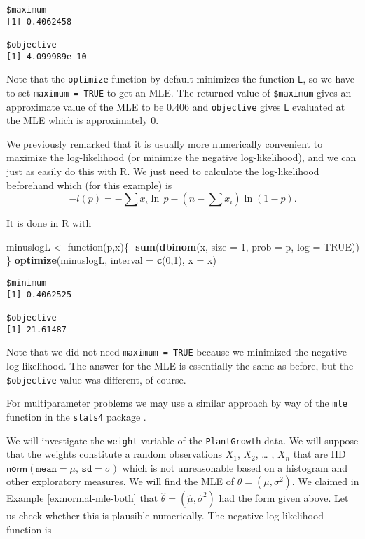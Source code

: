 \documentclass[]{book}
\newenvironment{Shaded}{\begin{snugshade}}{\end{snugshade}}
\newcommand{\KeywordTok}[1]{\textcolor[rgb]{0.13,0.29,0.53}{\textbf{{#1}}}}
\newcommand{\DataTypeTok}[1]{\textcolor[rgb]{0.13,0.29,0.53}{{#1}}}
\newcommand{\DecValTok}[1]{\textcolor[rgb]{0.00,0.00,0.81}{{#1}}}
\newcommand{\StringTok}[1]{\textcolor[rgb]{0.31,0.60,0.02}{{#1}}}
\newcommand{\OtherTok}[1]{\textcolor[rgb]{0.56,0.35,0.01}{{#1}}}
\newcommand{\NormalTok}[1]{{#1}}
\numberwithin{equation}{chapter}
\numberwithin{figure}{chapter}
\theoremstyle{plain}
\theoremstyle{definition}
\theoremstyle{remark}
\theoremstyle{definition}
\theoremstyle{definition}
\theoremstyle{remark}
\let\BeginKnitrBlock\begin \let\EndKnitrBlock\end
\begin{document}
\begin{verbatim}
$maximum
[1] 0.4062458

$objective
[1] 4.099989e-10
\end{verbatim}

Note that the \texttt{optimize} function by default minimizes the
function \texttt{L}, so we have to set \texttt{maximum\ =\ TRUE} to get
an MLE. The returned value of \texttt{\$maximum} gives an approximate
value of the MLE to be 0.406 and \texttt{objective} gives \texttt{L}
evaluated at the MLE which is approximately 0.

We previously remarked that it is usually more numerically convenient to
maximize the log-likelihood (or minimize the negative log-likelihood),
and we can just as easily do this with R. We just need to calculate the
log-likelihood beforehand which (for this example) is
\[ -l(p)=-\sum x_{i}\ln\,
p-\left(n-\sum x_{i}\right)\ln(1-p).  \]

It is done in R with

\begin{Shaded}
\begin{Highlighting}[]
\NormalTok{minuslogL <-}\StringTok{ }\NormalTok{function(p,x)\{}
                \NormalTok{-}\KeywordTok{sum}\NormalTok{(}\KeywordTok{dbinom}\NormalTok{(x, }\DataTypeTok{size =} \DecValTok{1}\NormalTok{, }\DataTypeTok{prob =} \NormalTok{p, }\DataTypeTok{log =} \OtherTok{TRUE}\NormalTok{))}
             \NormalTok{\}}
\KeywordTok{optimize}\NormalTok{(minuslogL, }\DataTypeTok{interval =} \KeywordTok{c}\NormalTok{(}\DecValTok{0}\NormalTok{,}\DecValTok{1}\NormalTok{), }\DataTypeTok{x =} \NormalTok{x)}
\end{Highlighting}
\end{Shaded}

\begin{verbatim}
$minimum
[1] 0.4062525

$objective
[1] 21.61487
\end{verbatim}

Note that we did not need \texttt{maximum\ =\ TRUE} because we minimized
the negative log-likelihood. The answer for the MLE is essentially the
same as before, but the \texttt{\$objective} value was different, of
course.

For multiparameter problems we may use a similar approach by way of the
\texttt{mle} function in the \texttt{stats4} package \autocite{stats4}.

\bigskip

\BeginKnitrBlock{example}[Plant Growth]
\protect\hypertarget{ex:unnamed-chunk-347}{}{\label{ex:unnamed-chunk-347}
\iffalse (Plant Growth) \fi }We will investigate the \texttt{weight}
variable of the \texttt{PlantGrowth} data. We will suppose that the
weights constitute a random observations \(X_{1}\), \(X_{2}\), \ldots{}
, \(X_{n}\) that are IID
\(\mathsf{norm}(\mathtt{mean}=\mu,\,\mathtt{sd}=\sigma)\) which is not
unreasonable based on a histogram and other exploratory measures. We
will find the MLE of \(\theta=(\mu,\sigma^{2})\). We claimed in Example
\ref{ex:normal-mle-both} that
\(\hat{\theta}=(\hat{\mu},\hat{\sigma}^{2})\) had the form given above.
Let us check whether this is plausible numerically. The negative
log-likelihood function is
\EndKnitrBlock{example}
\end{document}
